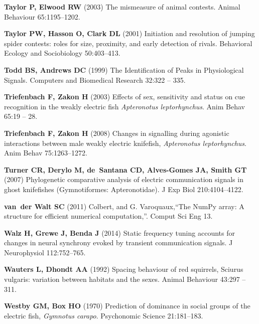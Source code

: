 \documentclass[vruler,JEB]{COB}%
\begin{document}
\begin{thebibliography}{70}
\textbf{Taylor P, Elwood RW} (2003) The mismeasure of animal contests.
 Animal Behaviour 65:1195--1202.

\textbf{Taylor PW, Hasson O, Clark DL} (2001) Initiation and resolution of jumping
  spider contests: roles for size, proximity, and early detection of rivals.
 Behavioral Ecology and Sociobiology 50:403--413.

\textbf{Todd BS, Andrews DC} (1999) The Identification of Peaks in Physiological
  Signals.
 Computers and Biomedical Research 32:322 -- 335.

\textbf{Triefenbach F, Zakon H} (2003) Effects of sex, sensitivity and status on cue
  recognition in the weakly electric fish \textit{Apteronotus leptorhynchus}.
 Anim Behav 65:19 -- 28.

\textbf{Triefenbach F, Zakon H} (2008) Changes in signalling during agonistic
  interactions between male weakly electric knifefish, \textit{Apteronotus
  leptorhynchus}.
 Anim Behav 75:1263--1272.

\textbf{Turner CR, Derylo M, de~Santana CD, Alves-Gomes JA, Smith GT} (2007)
  Phylogenetic comparative analysis of electric communication signals in ghost
  knifefishes (Gymnotiformes: Apteronotidae).
 J Exp Biol 210:4104--4122.

\textbf{van~der Walt SC} (2011) Colbert, and G. Varoquaux,“The NumPy array: A
  structure for efficient numerical computation,”.
 Comput Sci Eng 13.

\textbf{Walz H, Grewe J, Benda J} (2014) Static frequency tuning accounts for changes in
  neural synchrony evoked by transient communication signals.
 J Neurophysiol 112:752--765.

\textbf{Wauters L, Dhondt AA} (1992) Spacing behaviour of red squirrels, Sciurus
  vulgaris: variation between habitats and the sexes.
 Animal Behaviour 43:297 -- 311.

\textbf{Westby GM, Box HO} (1970) Prediction of dominance in social groups of the
  electric fish, \textit{Gymnotus carapo}.
 Psychonomic Science 21:181--183.


\end{thebibliography}
\end{document}
